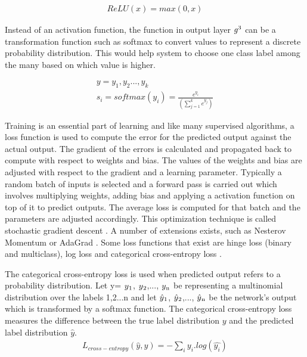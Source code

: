 \documentclass[a4paper, 11pt]{article}
\begin{document}
\begin{align*}
ReLU(x) = max(0,x)
\end{align*}

Instead of an activation function, the function in output layer $g\textsuperscript{3}$ can be a transformation function such as softmax to convert values to represent a discrete probability distribution. This would help system to choose one class label among the many based on which value is higher.

\begin{align*}
y = y_1,y_2...,y_k \\
s_i = softmax(y_i) = \frac{e^{y_i}}{(\sum_{j=1}^ke^{y_j})}
\end{align*}

Training is an essential part of learning and like many supervised algorithms, a loss function is used to compute the error for the predicted output against the actual output. The gradient of the errors is calculated and propagated back to compute with respect to weights and bias. The values of the weights and bias are adjusted with respect to the gradient and a learning parameter. Typically a random batch of inputs is selected and a forward pass is carried out which involves multiplying weights, adding bias and applying a activation function on top of it to predict outputs. The average loss is computed for that batch and the parameters are adjusted accordingly. This optimization technique is called stochastic gradient descent \cite{Bottou2012}. A number of extensions exists, such as Nesterov Momentum \cite{Sutskever2013} or AdaGrad \cite{Duchi2011}. Some loss functions that exist are hinge loss (binary and multiclass), log loss and categorical cross-entropy loss \cite{Goldberg2016}. 


The categorical cross-entropy loss is used when predicted output refers to a probability distribution. Let y= $y\textsubscript{1}$, $y\textsubscript{2}$,..., $y\textsubscript{n}$ be representing a multinomial distribution over the labels 1,2...n and let $\hat{y}\textsubscript{1}$, $\hat{y}\textsubscript{2}$,..., $\hat{y}\textsubscript{n}$ be the network's output which is transformed by a softmax function. The categorical cross-entropy loss measures the difference between the true label distribution $y$ and the predicted label distribution $\hat{y}$. 
\begin{align*}
L_{cross-entropy}(\hat{y},y) = -\sum_iy_i.log(\hat{y_i})
\end{align*}
\end{document}
